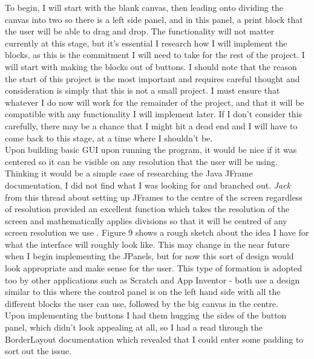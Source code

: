 \documentclass[a4paper, 12pt]{article}
\begin{document}
            To begin, I will start with the blank canvas, then leading onto dividing the canvas into two
            so there is a left side panel, and in this panel, a print block that the user will be able
            to drag and drop. The functionality will not matter currently at this stage, but it's
            essential I research how I will implement the blocks, as this is the commitment I will need
            to take for the rest of the project. I will start with making the blocks out of buttons.
            I should note that the reason the start of this project is the most important and requires
            careful thought and consideration is simply that this is not a small project. I must
            ensure that whatever I do now will work for the remainder of the project, and that it will
            be compatible with any functionality I will implement later. If I don't consider this
            carefully, there may be a chance that I might hit a dead end and I will have to come back
            to this stage, at a time where I shouldn't be. \\

            Upon building basic GUI upon running the program, it would be nice if it was centered so it
            can be visible on any resolution that the user will be using. Thinking it would be a simple
            case of researching the Java JFrame documentation, I did not find what I was looking for and
            branched out. \textit{Jack} from this thread about setting up JFrames to the centre of the
            screen regardless of resolution provided an excellent function which takes the resolution of
            the screen and mathematically applies divisions so that it will be centred of any screen
            resolution we use \cite{jackSO}. Figure 9 shows a rough sketch about the idea I have for what the interface will roughly look
            like. This may change in the near future when I begin implementing the JPanels, but for now
            this sort of design would look appropriate and make sense for the user. This type of formation
            is adopted too by other applications such as Scratch and App Inventor - both use a design
            similar to this where the control panel is on the left hand side with all the different
            blocks the user can use, followed by the big canvas in the centre. \\


            Upon implementing the buttons I had them hugging the sides of the button panel, which didn't
            look appealing at all, so I had a read through the BorderLayout documentation which revealed
            that I could enter some padding to sort out the issue.
\end{document}
